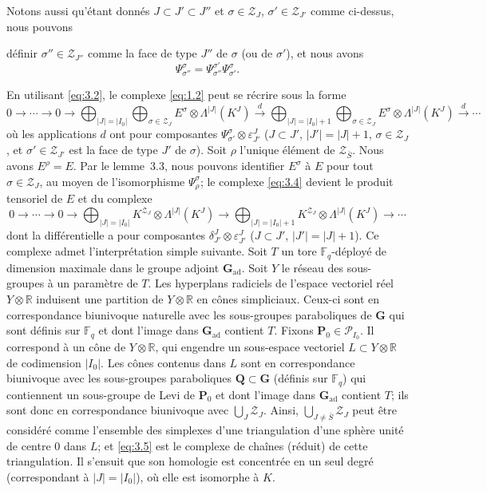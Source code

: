\documentclass[10pt,a4paper]{article}
\theoremstyle{plain}
\theoremstyle{definition}
\theoremstyle{remark}
\newcommand{\R}{\mathbb{R}}
\newcommand{\F}{\mathbb{F}}
\newcommand{\cP}{\mathcal{P}}
\newcommand{\cZ}{\mathcal{Z}}
\newcommand{\bG}{\mathbf{G}}
\newcommand{\bP}{\mathbf{P}}
\newcommand{\bQ}{\mathbf{Q}}
\begin{document}
Notons aussi qu'étant donnés $J \subset J' \subset J''$ et $\sigma \in \cZ_J$, $\sigma' \in \cZ_{J'}$ comme ci-dessus, nous pouvons

\newpage
\noindent définir $\sigma'' \in \cZ_{J''}$ comme la face de type $J''$ de $\sigma$ (ou de $\sigma'$), et nous avons
\begin{equation*}
\Psi_{\sigma''}^{\sigma} = \Psi_{\sigma''}^{\sigma'}\Psi_{\sigma'}^{\sigma}.
\end{equation*}

En utilisant \eqref{eq:3.2}, le complexe \eqref{eq:1.2} peut se récrire sous la forme
\begin{equation}\tag{3.4}\label{eq:3.4}
0 \to \cdots \to 0 \to \bigoplus_{|J|=|I_0|} \bigoplus_{\sigma \in \cZ_J} E^\sigma \otimes \Lambda^{|J|}(K^J) \xrightarrow{d} \bigoplus_{|J|=|I_0|+1} \bigoplus_{\sigma \in \cZ_J} E^\sigma \otimes \Lambda^{|J|}(K^J) \xrightarrow{d} \cdots
\end{equation}
où les applications $d$ ont pour composantes $\Psi_{\sigma'}^{\sigma} \otimes \varepsilon_{J'}^{J}$ ($J \subset J'$, $|J'| = |J|+1$, $\sigma \in \cZ_J$, et $\sigma' \in \cZ_{J'}$ est la face de type $J'$ de $\sigma$). Soit $\rho$ l'unique élément de $\cZ_{\bar S}$. Nous avons $E^\rho = E$. Par le lemme~3.3, nous pouvons identifier $E^\sigma$ à $E$ pour tout $\sigma \in \cZ_J$, au moyen de l'isomorphisme $\Psi_\rho^\sigma$; le complexe \eqref{eq:3.4} devient le produit tensoriel de $E$ et du complexe
\begin{equation}\tag{3.5}\label{eq:3.5}
0 \to \cdots \to 0 \to \bigoplus_{|J|=|I_0|} K^{\cZ_J} \otimes \Lambda^{|J|}(K^J) \to \bigoplus_{|J|=|I_0|+1} K^{\cZ_J} \otimes \Lambda^{|J|}(K^J) \to \cdots
\end{equation}
dont la différentielle a pour composantes $\delta_{J'}^J \otimes \varepsilon_{J'}^{J}$ ($J \subset J'$, $|J'| = |J|+1$). Ce complexe admet l'interprétation simple suivante. Soit $T$ un tore $\F_q$-déployé de dimension maximale dans le groupe adjoint $\bG_{\mathrm{ad}}$. Soit $Y$ le réseau des sous-groupes à un paramètre de $T$. Les hyperplans radiciels de l'espace vectoriel réel $Y \otimes \R$ induisent une partition de $Y \otimes \R$ en cônes simpliciaux. Ceux-ci sont en correspondance biunivoque naturelle avec les sous-groupes paraboliques de $\bG$ qui sont définis sur $\F_q$ et dont l'image dans $\bG_{\mathrm{ad}}$ contient $T$. Fixons $\bP_0 \in \cP_{I_0}$. Il correspond à un cône de $Y \otimes \R$, qui engendre un sous-espace vectoriel $L \subset Y \otimes \R$ de codimension $|I_0|$. Les cônes contenus dans $L$ sont en correspondance biunivoque avec les sous-groupes paraboliques $\bQ \subset \bG$ (définis sur $\F_q$) qui contiennent un sous-groupe de Levi de $\bP_0$ et dont l'image dans $\bG_{\mathrm{ad}}$ contient $T$; ils sont donc en correspondance biunivoque avec $\bigcup_J \cZ_J$. Ainsi, $\bigcup_{J \ne \bar S} \cZ_J$ peut être considéré comme l'ensemble des simplexes d'une triangulation d'une sphère unité de centre $0$ dans $L$; et \eqref{eq:3.5} est le complexe de chaînes (réduit) de cette triangulation. Il s'ensuit que son homologie est concentrée en un seul degré (correspondant à $|J| = |I_0|$), où elle est isomorphe à $K$.
\end{document}
